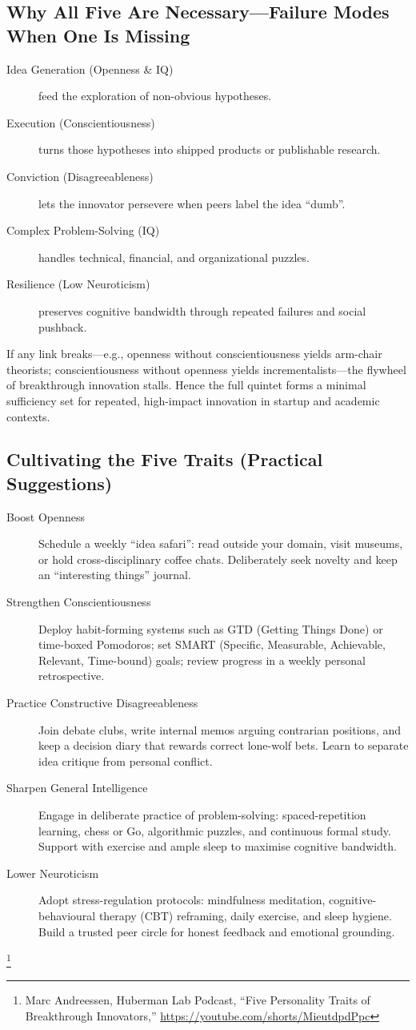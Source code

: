 \subsection{Why All Five Are Necessary---Failure Modes When One Is Missing}
\begin{description}
  \item[Idea Generation (Openness \& IQ)] feed the exploration of non-obvious hypotheses.
  \item[Execution (Conscientiousness)] turns those hypotheses into shipped products or publishable research.
  \item[Conviction (Disagreeableness)] lets the innovator persevere when peers label the idea ``dumb''.
  \item[Complex Problem-Solving (IQ)] handles technical, financial, and organizational puzzles.
  \item[Resilience (Low Neuroticism)] preserves cognitive bandwidth through repeated failures and social pushback.
\end{description}

If any link breaks---e.g., openness without conscientiousness yields arm-chair theorists; conscientiousness without openness yields incrementalists---the flywheel of breakthrough innovation stalls.
Hence the full quintet forms a minimal sufficiency set for repeated, high-impact innovation in startup and academic contexts.

\subsection{Cultivating the Five Traits (Practical Suggestions)}
\begin{description}
  \item[Boost Openness] Schedule a weekly ``idea safari'': read outside your domain, visit museums, or hold cross-disciplinary coffee chats. Deliberately seek novelty and keep an ``interesting things'' journal.
  \item[Strengthen Conscientiousness] Deploy habit-forming systems such as GTD (Getting Things Done) or time-boxed Pomodoros; set \textsc{SMART} (Specific, Measurable, Achievable, Relevant, Time-bound) goals; review progress in a weekly personal retrospective.
  \item[Practice Constructive Disagreeableness] Join debate clubs, write internal memos arguing contrarian positions, and keep a decision diary that rewards correct lone-wolf bets. Learn to separate idea critique from personal conflict.
  \item[Sharpen General Intelligence] Engage in deliberate practice of problem-solving: spaced-repetition learning, chess or Go, algorithmic puzzles, and continuous formal study. Support with exercise and ample sleep to maximise cognitive bandwidth.
  \item[Lower Neuroticism] Adopt stress-regulation protocols: mindfulness meditation, cognitive-behavioural therapy (CBT) reframing, daily exercise, and sleep hygiene. Build a trusted peer circle for honest feedback and emotional grounding.
\end{description}

\footnote{Marc Andreessen, Huberman Lab Podcast, ``Five Personality Traits of Breakthrough Innovators,'' \url{https://youtube.com/shorts/MieutdpdPpc}}
